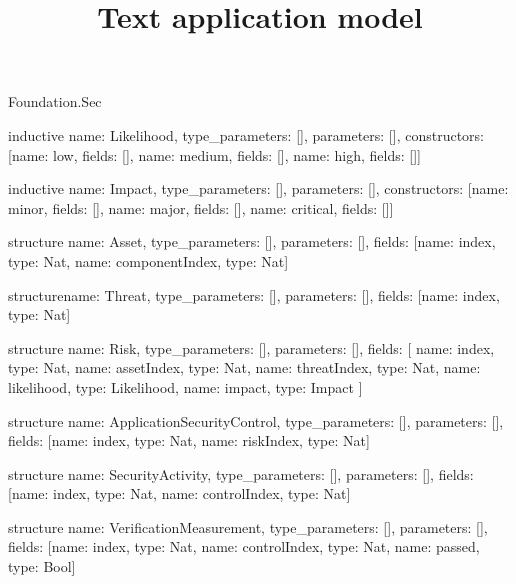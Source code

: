 \begin{lexlean}{Foundation.Sec}
\title{Text application model}
\begin{semanticmodule}
inductive{
  name: Likelihood,
  type_parameters: [],
  parameters: [],
  constructors: [{name: low, fields: []}, {name: medium, fields: []}, {name: high, fields: []}]
}

inductive{
  name: Impact,
  type_parameters: [],
  parameters: [],
  constructors: [{name: minor, fields: []}, {name: major, fields: []}, {name: critical, fields: []}]
}

structure{
  name: Asset,
  type_parameters: [],
  parameters: [],
  fields: [{name: index, type: Nat}, {name: componentIndex, type: Nat}]
}

structure{name: Threat, type_parameters: [], parameters: [], fields: [{name: index, type: Nat}]}

structure{
  name: Risk,
  type_parameters: [],
  parameters: [],
  fields: [
    {name: index, type: Nat},
    {name: assetIndex, type: Nat},
    {name: threatIndex, type: Nat},
    {name: likelihood, type: Likelihood},
    {name: impact, type: Impact}
  ]
}

structure{
  name: ApplicationSecurityControl,
  type_parameters: [],
  parameters: [],
  fields: [{name: index, type: Nat}, {name: riskIndex, type: Nat}]
}

structure{
  name: SecurityActivity,
  type_parameters: [],
  parameters: [],
  fields: [{name: index, type: Nat}, {name: controlIndex, type: Nat}]
}

structure{
  name: VerificationMeasurement,
  type_parameters: [],
  parameters: [],
  fields: [{name: index, type: Nat}, {name: controlIndex, type: Nat}, {name: passed, type: Bool}]
}
\end{semanticmodule}
\end{lexlean}

